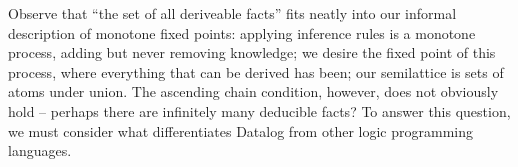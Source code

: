
Observe that ``the set of all deriveable facts'' fits neatly into our informal
description of monotone fixed points: applying inference rules is a monotone
process, adding but never removing knowledge; we desire the fixed point of this
process, where everything that can be derived has been; our semilattice is sets
of atoms under union. The ascending chain condition, however, does not obviously
hold -- perhaps there are infinitely many deducible facts? To answer this
question, we must consider what differentiates Datalog from other logic
programming languages.








